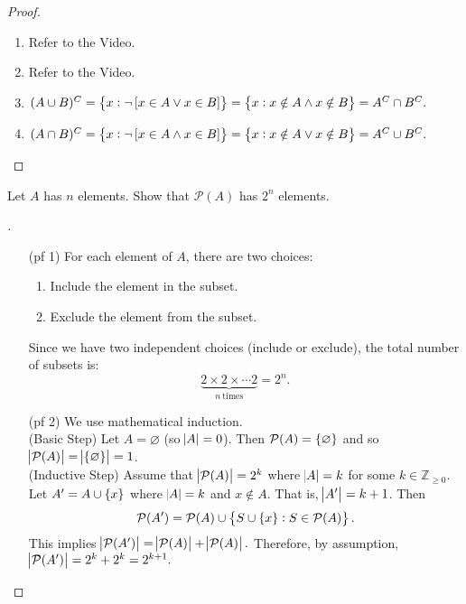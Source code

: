 \documentclass[11pt,openany]{article}
\begin{document}
\begin{proof}
	\begin{enumerate}[(1)]
		\item Refer to the Video\cite{set_thery_a}.
		\item Refer to the Video\cite{set_thery_a}.
		\item \textcolor{gray!50!white}{$(A\cup B)^C=\set{x:\lnot\left[x\in A\lor x\in B\right]}=\set{x:x\notin A\land x\notin B}=A^C\cap B^C.$}
		\item \textcolor{gray!50!white}{$(A\cap B)^C=\set{x:\lnot\left[x\in A\land x\in B\right]}=\set{x:x\notin A\lor x\notin B}=A^C\cup B^C.$}
	\end{enumerate}
\end{proof}

\vfill
\begin{exercise*}
	Let $A$ has $n$ elements. Show that $\mathcal{P}(A)$ has $2^n$ elements.
	\begin{proof}[\sol] 
		\textcolor{gray!50!white}{\begin{itemize}
			\item[(pf 1)] For each element of $A$, there are two choices:
			\begin{enumerate}
				\item Include the element in the subset.
				\item Exclude the element from the subset.
			\end{enumerate}
			Since we have two independent choices (include or exclude), the total number of subsets is:
			\[
			\underbrace{2\times 2\times\cdots 2}_{n\ \text{times}}=2^n.
			\]
			\item[(pf 2)] We use mathematical induction.
			\ \\
			(Basic Step) Let $A=\varnothing$ (so $\abs{A}=0$). Then $\mathcal{P}(A)=\set{\varnothing}$ and so $\abs{\mathcal{P}(A)}=\abs{\set{\varnothing}}=1$.
			\ \\
			(Inductive Step) Assume that $\abs{\mathcal{P}(A)}=2^k$ where $\abs{A}=k$ for some $k\in\mathbb{Z}_{\geq  0}$. Let $A'=A\cup\set{x}$ where $\abs{A}=k$ and $x\notin A$. That is, $\abs{A'}=k+1$. Then \[
			\mathcal{P}(A')=\mathcal{P}(A)\cup\set{S\cup \set{x}:S\in \mathcal{P}(A)}.
			\] This implies $\abs{\mathcal{P}(A')}=\abs{\mathcal{P}(A)} + \abs{\mathcal{P}(A)}.$ Therefore, by assumption, $\abs{\mathcal{P}(A')}=2^k + 2^k=2^{k+1}.$
		\end{itemize}}
	\end{proof}
\end{exercise*}
\end{document}
